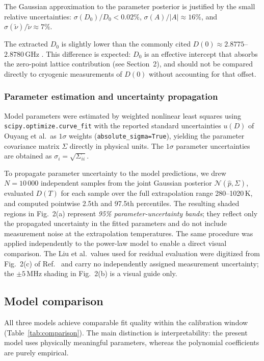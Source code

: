 \documentclass[12pt,a4paper]{article}
\begin{document}
The Gaussian approximation to the parameter posterior is justified by
the small relative uncertainties:
$\sigma(D_0)/D_0 < 0.02\%$,
$\sigma(A)/|A| \approx 16\%$, and
$\sigma(\tilde{\nu})/\tilde{\nu} \approx 7\%$.

The extracted $D_0$ is slightly lower than the commonly cited
$D(0) \approx 2.8775$--$2.8780$\,GHz \cite{Doherty2014}.
This difference is expected: $D_0$ is an effective intercept that
absorbs the zero-point lattice contribution (see Section~2), and should
not be compared directly to cryogenic measurements of $D(0)$ without
accounting for that offset.

\subsubsection*{Parameter estimation and uncertainty propagation}

Model parameters were estimated by weighted nonlinear least squares
using \texttt{scipy.optimize.curve\_fit} with the reported standard
uncertainties $u(D)$ of Ouyang et al.\ as $1\sigma$ weights
(\texttt{absolute\_sigma=True}), yielding the parameter covariance
matrix $\Sigma$ directly in physical units.
The $1\sigma$ parameter uncertainties are obtained as
$\sigma_i = \sqrt{\Sigma_{ii}}$.

To propagate parameter uncertainty to the model predictions, we drew
$N = 10\,000$ independent samples from the joint Gaussian posterior
$\mathcal{N}(\hat{p}, \Sigma)$, evaluated $D(T)$ for each sample over
the full extrapolation range 280--1020\,K, and computed pointwise
2.5th and 97.5th percentiles.
The resulting shaded regions in Fig.~2(a) represent
\emph{95\% parameter-uncertainty bands}; they reflect only the
propagated uncertainty in the fitted parameters and do not include
measurement noise at the extrapolation temperatures.
The same procedure was applied independently to the power-law model
to enable a direct visual comparison.
The Liu et al.\ values used for residual evaluation were digitized
from Fig.~2(c) of Ref.~\cite{Liu2019} and carry no independently
assigned measurement uncertainty; the $\pm5$\,MHz shading in
Fig.~2(b) is a visual guide only.

\subsection{Model comparison}

All three models achieve comparable fit quality within the calibration
window (Table~\ref{tab:comparison}).
The main distinction is interpretability: the present model uses
physically meaningful parameters, whereas the polynomial coefficients
are purely empirical.
\end{document}
